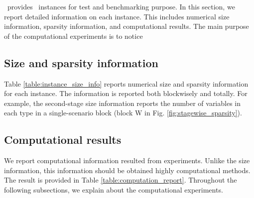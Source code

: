 %
%

\siplibtwo\ provides \smps\ instances for test and benchmarking  purpose. In this section, we report detailed information on each instance. This includes numerical size information, sparsity information, and computational results. The main purpose of the computational experiments is to notice 

\subsection{Size and sparsity information}
Table \ref{table:instance_size_info} reports numerical size and sparsity information for each instance. The information is reported both blockwisely and totally. For example, the second-stage size information reports the number of variables in each type in a single-scenario block (block W in Fig. \ref{fig:stagewise_sparsity}).


\subsection{Computational results}
We report computational information resulted from experiments. Unlike the size information, this information should be obtained highly computational methods. The result is provided in Table \ref{table:computation_report}. Throughout the following subsections, we explain about the computational experiments.

